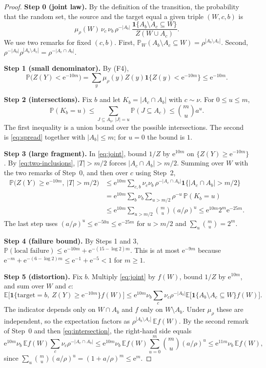 \documentclass[11pt]{article}
\numberwithin{equation}{section}
\newcommand{\PP}{\mathbb P}
\newcommand{\EE}{\mathbb E}
\newcommand{\ind}{\mathbf 1}
\newcommand{\ee}{\mathrm e}
\newcommand{\Step}[1]{\par\smallskip\noindent\textbf{Step #1.}}
\begin{document}
\begin{proof}
\Step{0 (joint law)} By the definition of the transition, the probability that
the random set, the source and the target equal a given triple $(W,c,b)$ is
\begin{equation}\label{eq:joint}
 \mu_\rho(W)\,\nu_c\,\nu_b\,\rho^{-|A_b|}\,
 \frac{\ind\{A_b\setminus A_c\subseteq W\}}{Z(W\cup A_c)} .
\end{equation}
We use two remarks for fixed $(c,b)$. First,
$\PP_W(A_b\setminus A_c\subseteq W)=\rho^{|A_b\setminus A_c|}$. Second,
$\rho^{-|A_b|}\rho^{|A_b\setminus A_c|}=\rho^{-|A_c\cap A_b|}$.

\Step{1 (small denominator)} By (F4),
\[
 \PP\bigl(Z(Y)<\ee^{-10m}\bigr)
 =\sum_y\mu_\rho(y)Z(y)\ind\{Z(y)<\ee^{-10m}\}\le\ee^{-10m}.
\]

\Step{2 (intersections)} Fix $b$ and let $K_b=|A_c\cap A_b|$ with $c\sim\nu$.
For $0\le u\le m$,
\begin{equation}\label{eq:intersection}
 \PP(K_b=u)\le\sum_{J\subseteq A_b,\ |J|=u}\PP(J\subseteq A_c)\le\binom mu a^u .
\end{equation}
The first inequality is a union bound over the possible intersections. The
second is \eqref{eq:spread} together with $|A_b|\le m$; for $u=0$ the bound is $1$.

\Step{3 (large fragment)} In \eqref{eq:joint}, bound $1/Z$ by $\ee^{10m}$ on
$\{Z(Y)\ge\ee^{-10m}\}$. By \eqref{eq:two-inclusions}, $|T|>m/2$ forces
$|A_c\cap A_b|>m/2$. Summing over $W$ with the two remarks of Step~0, and then
over $c$ using Step~2,
\begin{align*}
 \PP\bigl(Z(Y)\ge\ee^{-10m},\ |T|>m/2\bigr)
 &\le\ee^{10m}\sum_{c,b}\nu_c\nu_b\,\rho^{-|A_c\cap A_b|}\ind\{|A_c\cap A_b|>m/2\}\\
 &=\ee^{10m}\sum_b\nu_b\sum_{u>m/2}\rho^{-u}\,\PP(K_b=u)\\
 &\le\ee^{10m}\sum_{u>m/2}\binom mu(a/\rho)^u\le\ee^{10m}2^m\ee^{-25m}.
\end{align*}
The last step uses $(a/\rho)^u\le\ee^{-50u}\le\ee^{-25m}$ for $u>m/2$ and
$\sum_u\binom mu=2^m$.

\Step{4 (failure bound)} By Steps 1 and 3,
$\PP(\text{local failure})\le\ee^{-10m}+\ee^{-(15-\log2)m}$. This is at most
$\ee^{-9m}$ because $\ee^{-m}+\ee^{-(6-\log2)m}\le\ee^{-1}+\ee^{-5}<1$ for $m\ge1$.

\Step{5 (distortion)} Fix $b$. Multiply \eqref{eq:joint} by $f(W)$, bound $1/Z$
by $\ee^{10m}$, and sum over $W$ and $c$:
\[
 \EE\bigl[\ind\{\mathrm{target}=b,\ Z(Y)\ge\ee^{-10m}\} f(W)\bigr]
 \le\ee^{10m}\nu_b\sum_c\nu_c\rho^{-|A_b|}
       \EE\bigl[\ind\{A_b\setminus A_c\subseteq W\}f(W)\bigr].
\]
The indicator depends only on $W\cap A_b$ and $f$ only on $W\setminus A_b$.
Under $\mu_\rho$ these are independent, so the expectation factors as
$\rho^{|A_b\setminus A_c|}\,\EE f(W)$. By the second remark of Step~0 and then
\eqref{eq:intersection}, the right-hand side equals
\[
 \ee^{10m}\nu_b\,\EE f(W)\sum_c\nu_c\rho^{-|A_c\cap A_b|}
 \le\ee^{10m}\nu_b\,\EE f(W)\sum_{u=0}^m\binom mu(a/\rho)^u
 \le\ee^{11m}\nu_b\,\EE f(W),
\]
since $\sum_{u}\binom mu(a/\rho)^u=(1+a/\rho)^m\le\ee^m$.
\end{proof}
\end{document}
